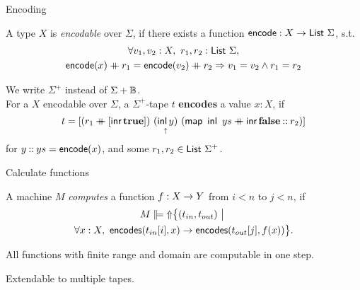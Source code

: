 \begin{frame}{Encoding}
  \begin{definition}
    A type $X$ is \emph{encodable} over $\Sigma$, if there exists a function $\textsf{encode} : X \rightarrow \textsf{List}~\Sigma$, s.t.
    \begin{multline*}
      \forall v_1,v_2:X,~r_1,r_2: \textsf{List}~\Sigma, \\
      \textsf{encode}(x) \mathbin{+\mkern-10mu+} r_1 = \textsf{encode}(v_2) \mathbin{+\mkern-10mu+} r_2 \Rightarrow
      v_1 = v_2 \land r_1 = r_2
    \end{multline*}
  \end{definition}
  \pause%
  \begin{definition}
    We write $\Sigma^+$ instead of $\Sigma + \mathbb{B}$. \\
    For a $X$ encodable over $\Sigma$, a $\Sigma^+$-tape $t$ \textbf{encodes} a value $x:X$, if
    \[t = [ (r_1 \mathbin{+\mkern-10mu+} [\operatorname{\textsf{inr}} \mathbf{true}])~\underset{\uparrow}{(\operatorname{\textsf{inl}} y)}~(\textsf{map}~\operatorname{\textsf{inl}}~ys \mathbin{+\mkern-10mu+} \operatorname{\textsf{inr}} \mathbf{false} \mathbin{::} r_2) ]\]
    for $y \mathbin{::} ys = \textsf{encode}(x)$, and some $r_1, r_2 \in \textsf{List}~\Sigma^+$.
  \end{definition}
\end{frame}

\begin{frame}{Calculate functions}
  \begin{definition}
    A machine $M$ \emph{computes} a function $f : X \rightarrow Y$ from $i < n$ to $j < n$, if
    \begin{multline*}
      M \VDash \ignoreParam \setMap{(t_{in}, t_{out})}{\\
      \forall x:X,~ \MS{encodes}(t_{in}[i], x) \rightarrow \MS{encodes}(t_{out}[j], f(x))}.
    \end{multline*}
  \end{definition}
  \pause%
  \begin{lemma}
    All functions with finite range and domain are computable in one step.
  \end{lemma}
  \pause%
  Extendable to multiple tapes.
\end{frame}

